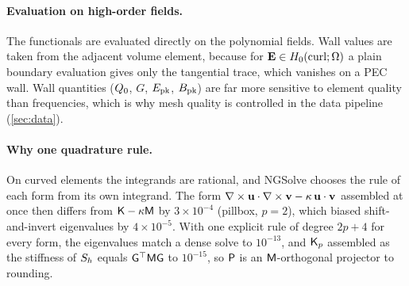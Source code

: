 \paragraph{Evaluation on high-order fields.}
The functionals are evaluated directly on the polynomial fields. Wall values are taken from the adjacent volume element, because for $\mathbf{E}\in H_0(\mathrm{curl};\Omega)$ a plain boundary
evaluation gives only the tangential trace, which vanishes on a PEC wall. Wall quantities ($\Qz$, $G$, $\Epk$, $\Bpk$) are far more sensitive to element quality than
frequencies, which is why mesh quality is controlled in the data pipeline (\cref{sec:data}).

\paragraph{Why one quadrature rule.}
On curved elements the integrands are rational, and NGSolve chooses the rule of each form from its own integrand. The form
$\nabla\times\mathbf u\cdot\nabla\times\mathbf v-\kappa\,\mathbf u\cdot\mathbf v$ assembled at once then differs from $\mathsf{K}-\kappa\mathsf{M}$ by $3\times10^{-4}$ (pillbox, $p=2$), which biased
shift-and-invert eigenvalues by $4\times10^{-5}$. With one explicit rule of degree $2p+4$ for every form, the eigenvalues match a dense solve to $10^{-13}$, %
and $\Kp$ assembled as the stiffness of $S_h$ equals $\mathsf{G}^\top\mathsf{M}\mathsf{G}$ to $10^{-15}$, %
so $\mathsf{P}$ is an $\mathsf{M}$-orthogonal projector to rounding.
